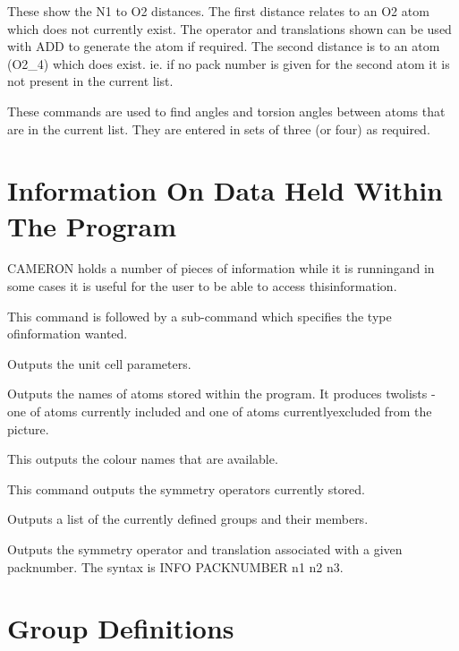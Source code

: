 \documentclass[10pt,a4paper]{report}
\begin{document}
These show the N1 to O2 distances. The first distance relates to an O2
atom which does not currently exist. The operator and translations shown
can be used with ADD to generate the atom if required. The second
distance is to an atom (O2\_4) which does exist. ie. if no pack number is
given for the second atom it is not present in the current list.


\bigskip{}




\bigskip{}




These commands are used to find angles and torsion angles between
atoms that are in the current list. They are entered in sets of three
(or four) as required.



\chapter{Information On Data Held Within The Program}

CAMERON holds a number of pieces of information while it is runningand in some cases it is useful for the user to be able to access thisinformation.

\bigskip{}



This command is followed by a sub-command which specifies the type ofinformation wanted.

\bigskip{}Outputs the unit cell parameters.

\bigskip{}Outputs the names of atoms stored within the program. It produces twolists - one of atoms currently included and one of atoms currentlyexcluded from the picture.

\bigskip{}This outputs the colour names that are available.

\bigskip{}This command outputs the symmetry operators currently stored.

\bigskip{}Outputs a list of the currently defined groups and their members.

\bigskip{}Outputs the symmetry operator and translation associated with a given packnumber. The syntax is INFO PACKNUMBER n1 n2 n3.

\chapter{Group Definitions}
\end{document}
